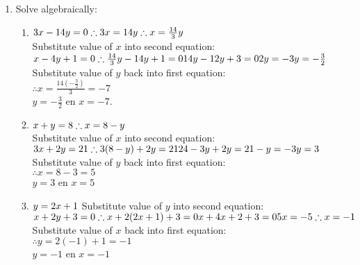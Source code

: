  \begin{solutions}{}{
\begin{enumerate}[itemsep=10pt, label=\textbf{\arabic*}. ] 
\item Solve algebraically: 
\begin{enumerate}[itemsep=5pt, label=\textbf{(\alph*)} ] 
\item $3x-14y=0\\\therefore 3x=14y\\ \therefore x=\frac{14}{3}y$\\
 Substitute value of $x$ into second equation: \\
$x-4y+1=0\\ \therefore \frac{14}{3}y-14y+1=0\\ 14y-12y+3=0\\2y=-3\\y=-\frac{3}{2}$\\ 
Substitute value of $y$ back into first equation:\\
$\therefore x=\frac{14 (-\frac{3}{2})}{3} = -7$\\
$y=-\frac{3}{2}$ en $x=-7$.

\item $x+y=8 \\ \therefore x=8-y$\\
Substitute value of $x$ into second equation:\\
$3x+2y=21 \\ \therefore 3(8-y)+2y = 21\\ 24-3y+2y=21\\ -y=-3\\y=3\\ $
Substitute value of $y$ back into first equation:\\
$\therefore x=8-3=5$\\
$y=3$ en $x=5$

\item $y=2x+1 \\ $
Substitute value of $y$ into second equation:\\
$ x+2y+3=0\\ \therefore x+2(2x+1)+3=0\\ 
x+4x+2+3=0\\
5x=-5\\
\therefore x=-1$\\ 
Substitute value of $x$ back into first equation:\\
$\therefore y=2(-1)+1=-1$\\
$y=-1$ en $x=-1$


\end{enumerate}
\end{enumerate}}
\end{solutions}
